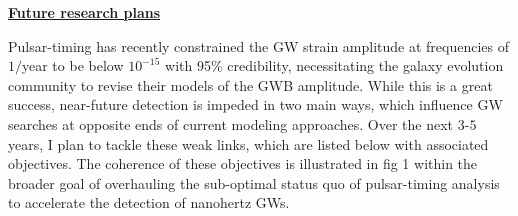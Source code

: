 \documentclass[11pt,letterpaper,sans]{moderncv} %
\begin{document}
\noindent \textbf{\underline{Future research plans}}

\noindent Pulsar-timing has recently constrained the GW strain amplitude at frequencies of $1/$year to be below $10^{-15}$ with 95$\%$ credibility, necessitating the galaxy evolution community to revise their models of the GWB amplitude. While this is a great success, near-future detection is impeded in two main ways, which influence GW searches at opposite ends of current modeling approaches. Over the next $3$-$5$ years, I plan to tackle these weak links, which are listed below with associated objectives. The coherence of these objectives is illustrated in fig 1 within the broader goal of overhauling the sub-optimal status quo of pulsar-timing analysis to accelerate the detection of nanohertz GWs.
\end{document}
